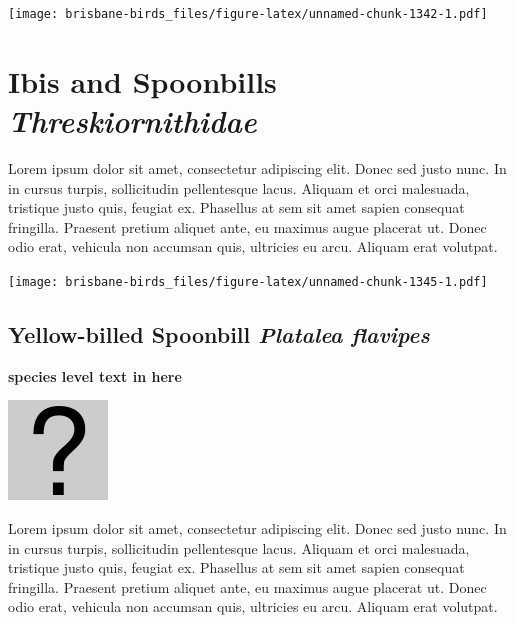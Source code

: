 \documentclass[]{book}
\let\origfigure\figure
\let\endorigfigure\endfigure
\renewenvironment{figure}[1][2] {
  \expandafter\origfigure\expandafter[H]
} {
  \endorigfigure
}
\begin{document}
\begin{figure}
\centering
\texttt{[image: brisbane-birds\_files/figure-latex/unnamed-chunk-1342-1.pdf]}
\caption{\label{fig:unnamed-chunk-1342}insert figure caption}
\end{figure}

\chapter{\texorpdfstring{Ibis and Spoonbills
\emph{Threskiornithidae}}{Ibis and Spoonbills Threskiornithidae}}\label{ibis-and-spoonbills-threskiornithidae}

Lorem ipsum dolor sit amet, consectetur adipiscing elit. Donec sed justo
nunc. In in cursus turpis, sollicitudin pellentesque lacus. Aliquam et
orci malesuada, tristique justo quis, feugiat ex. Phasellus at sem sit
amet sapien consequat fringilla. Praesent pretium aliquet ante, eu
maximus augue placerat ut. Donec odio erat, vehicula non accumsan quis,
ultricies eu arcu. Aliquam erat volutpat.

\texttt{[image: brisbane-birds\_files/figure-latex/unnamed-chunk-1345-1.pdf]}

\section{\texorpdfstring{Yellow-billed Spoonbill \emph{Platalea
flavipes}}{Yellow-billed Spoonbill Platalea flavipes}}\label{yellow-billed-spoonbill-platalea-flavipes}

\textbf{species level text in here}

\begin{figure}
\centering
\includegraphics{assets/missing.png}
\caption{No image for species}
\end{figure}

Lorem ipsum dolor sit amet, consectetur adipiscing elit. Donec sed justo
nunc. In in cursus turpis, sollicitudin pellentesque lacus. Aliquam et
orci malesuada, tristique justo quis, feugiat ex. Phasellus at sem sit
amet sapien consequat fringilla. Praesent pretium aliquet ante, eu
maximus augue placerat ut. Donec odio erat, vehicula non accumsan quis,
ultricies eu arcu. Aliquam erat volutpat.
\end{document}
